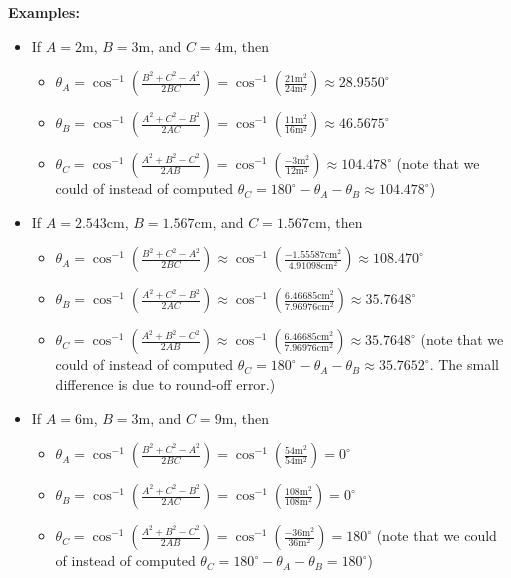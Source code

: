 \documentclass{article}
\begin{document}
{\bf Examples:}
\begin{itemize}
\item If \(A = 2\text{m}\), \(B = 3\text{m}\), and \(C = 4\text{m}\), then 
	\begin{itemize}
	\item[\textasteriskcentered] \(\theta_A = \cos^{-1}\left(\frac{B^2 + C^2 - A^2}{2BC}\right) = \cos^{-1}\left(\frac{21\text{m}^2}{24\text{m}^2}\right) \approx 28.9550^\circ\)
	\item[\textasteriskcentered] \(\theta_B = \cos^{-1}\left(\frac{A^2 + C^2 - B^2}{2AC}\right) = \cos^{-1}\left(\frac{11\text{m}^2}{16\text{m}^2}\right) \approx 46.5675^\circ\)
	\item[\textasteriskcentered] \(\theta_C = \cos^{-1}\left(\frac{A^2 + B^2 - C^2}{2AB}\right) = \cos^{-1}\left(\frac{-3\text{m}^2}{12\text{m}^2}\right) \approx 104.478^\circ\) (note that we could of instead of computed \(\theta_C = 180^\circ - \theta_A - \theta_B \approx 104.478^\circ\))
	\end{itemize}
\item If \(A = 2.543\text{cm}\), \(B = 1.567\text{cm}\), and \(C = 1.567\text{cm}\), then 
	\begin{itemize}
	\item[\textasteriskcentered] \(\theta_A = \cos^{-1}\left(\frac{B^2 + C^2 - A^2}{2BC}\right) \approx \cos^{-1}\left(\frac{-1.55587\text{cm}^2}{4.91098\text{cm}^2}\right) \approx 108.470^\circ\)
	\item[\textasteriskcentered] \(\theta_B = \cos^{-1}\left(\frac{A^2 + C^2 - B^2}{2AC}\right) \approx \cos^{-1}\left(\frac{6.46685\text{cm}^2}{7.96976\text{cm}^2}\right) \approx 35.7648^\circ\)
	\item[\textasteriskcentered] \(\theta_C = \cos^{-1}\left(\frac{A^2 + B^2 - C^2}{2AB}\right) \approx \cos^{-1}\left(\frac{6.46685\text{cm}^2}{7.96976\text{cm}^2}\right) \approx 35.7648^\circ\) (note that we could of instead of computed \(\theta_C = 180^\circ - \theta_A - \theta_B \approx 35.7652^\circ\). The small difference is due to round-off error.)
	\end{itemize}
\item If \(A = 6\text{m}\), \(B = 3\text{m}\), and \(C = 9\text{m}\), then
	\begin{itemize}
	\item[\textasteriskcentered] \(\theta_A = \cos^{-1}\left(\frac{B^2 + C^2 - A^2}{2BC}\right) = \cos^{-1}\left(\frac{54\text{m}^2}{54\text{m}^2}\right) = 0^\circ\)
	\item[\textasteriskcentered] \(\theta_B = \cos^{-1}\left(\frac{A^2 + C^2 - B^2}{2AC}\right) = \cos^{-1}\left(\frac{108\text{m}^2}{108\text{m}^2}\right) = 0^\circ\)
	\item[\textasteriskcentered] \(\theta_C = \cos^{-1}\left(\frac{A^2 + B^2 - C^2}{2AB}\right) = \cos^{-1}\left(\frac{-36\text{m}^2}{36\text{m}^2}\right) = 180^\circ\) (note that we could of instead of computed \(\theta_C = 180^\circ - \theta_A - \theta_B = 180^\circ\))
	\end{itemize}
\end{itemize}
\end{document}
